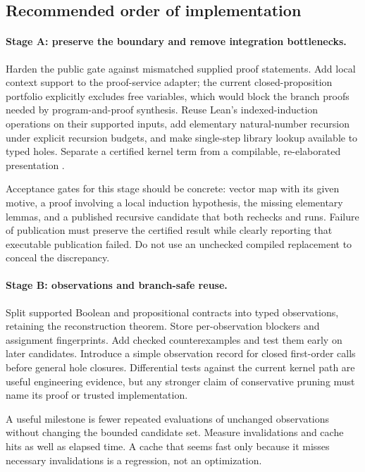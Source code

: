 \subsection{Recommended order of implementation}

\paragraph{Stage A: preserve the boundary and remove integration bottlenecks.}
Harden the public gate against mismatched supplied proof statements. Add local
context support to the proof-service adapter; the current closed-proposition
portfolio explicitly excludes free variables, which would block the branch
proofs needed by program-and-proof synthesis. Reuse Lean's indexed-induction
operations on their supported inputs, add elementary natural-number recursion
under explicit recursion budgets, and make single-step library lookup
available to typed holes. Separate a certified kernel term from a compilable,
re-elaborated presentation \cite{gatecode,searchcode,leaninduction,librarysearch}.

Acceptance gates for this stage should be concrete: vector map with its given
motive, a proof involving a local induction hypothesis, the missing elementary
 lemmas, and a published recursive candidate that both rechecks and
runs. Failure of publication must preserve the certified result while clearly
reporting that executable publication failed. Do not use an unchecked compiled
replacement to conceal the discrepancy.

\paragraph{Stage B: observations and branch-safe reuse.}
Split supported Boolean and propositional contracts into typed observations,
retaining the reconstruction theorem. Store per-observation blockers and
assignment fingerprints. Add checked counterexamples and test them early on
later candidates. Introduce a simple observation record for closed
first-order calls before general hole closures. Differential tests against
the current kernel path are useful engineering evidence, but any stronger
claim of conservative pruning must name its proof or trusted implementation.

A useful milestone is fewer repeated evaluations of unchanged observations
without changing the bounded candidate set. Measure invalidations and cache
hits as well as elapsed time. A cache that seems fast only because it misses
necessary invalidations is a regression, not an optimization.

